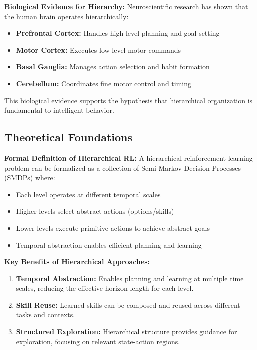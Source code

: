 \documentclass[12pt]{article}
\begin{document}
{{\textbf{Biological Evidence for Hierarchy:}
Neuroscientific research has shown that the human brain operates hierarchically:
\begin{itemize}
    \item \textbf{Prefrontal Cortex:} Handles high-level planning and goal setting
    \item \textbf{Motor Cortex:} Executes low-level motor commands
    \item \textbf{Basal Ganglia:} Manages action selection and habit formation
    \item \textbf{Cerebellum:} Coordinates fine motor control and timing
\end{itemize}

This biological evidence supports the hypothesis that hierarchical organization is fundamental to intelligent behavior.

\subsection{Theoretical Foundations}

\textbf{Formal Definition of Hierarchical RL:}
A hierarchical reinforcement learning problem can be formalized as a collection of Semi-Markov Decision Processes (SMDPs) where:
\begin{itemize}
    \item Each level operates at different temporal scales
    \item Higher levels select abstract actions (options/skills)
    \item Lower levels execute primitive actions to achieve abstract goals
    \item Temporal abstraction enables efficient planning and learning
\end{itemize}

\textbf{Key Benefits of Hierarchical Approaches:}
\begin{enumerate}
    \item \textbf{Temporal Abstraction:} Enables planning and learning at multiple time scales, reducing the effective horizon length for each level.
    
    \item \textbf{Skill Reuse:} Learned skills can be composed and reused across different tasks and contexts.
    
    \item \textbf{Structured Exploration:} Hierarchical structure provides guidance for exploration, focusing on relevant state-action regions.
    

\end{enumerate}}}
\end{document}
